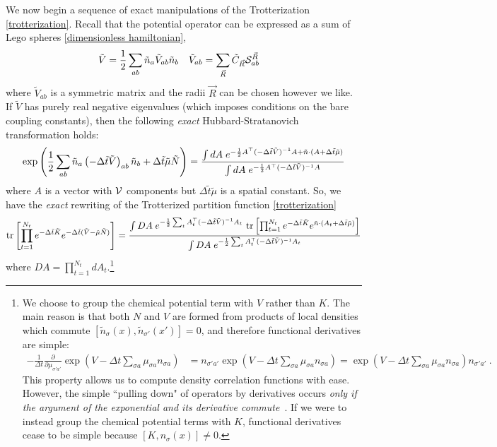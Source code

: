 We now begin a sequence of exact manipulations of the Trotterization \eqref{trotterization}.
Recall that the potential operator can be expressed as a sum of Lego spheres \eqref{dimensionless hamiltonian},
\begin{align}
	\tilde{V}
	&= \frac{1}{2} \sum_{ab} \tilde{n}_a \tilde{V}_{ab} \tilde{n}_b
	&
	\tilde{V}_{ab}
	&=
	\sum_{\vec{R}} \tilde{C}_{\vec{R}} \mathcal{S}^{\vec{R}}_{ab}
\end{align}
where $\tilde{V}_{ab}$ is a symmetric matrix and the radii $\vec{R}$ can be chosen however we like.
If $\tilde{V}$ has purely real negative eigenvalues (which imposes conditions on the bare coupling constants), then the following \emph{exact} Hubbard-Stratanovich transformation holds:
\begin{equation}
	\exp\left( \frac{1}{2} \sum_{ab}\tilde{n}_a \left(-\Delta\tilde{t} \tilde{V}\right)_{ab} \tilde{n}_b + \Delta \tilde{t} \tilde{\mu}\tilde{N}\right)
	=
	\frac{
		\int dA\; e^{-\frac{1}{2} A{}^{\top} (-\Delta\tilde{t} \tilde{V})^{-1} A + \tilde{n} \cdot (A + \Delta\tilde{t} \tilde{\mu} )}
	}{
		\int dA\; e^{-\frac{1}{2} A{}^{\top} (-\Delta\tilde{t} \tilde{V})^{-1} A}
	}
\end{equation}
where $A$ is a vector with $\mathcal{V}$ components but $\Delta\tilde{t}\tilde{\mu}$ is a spatial constant.
So, we have the \emph{exact} rewriting of the Trotterized partition function \eqref{trotterization}
\begin{equation}
	\text{tr}\left[\prod_{t=1}^{N_t} e^{-\Delta \tilde{t}\tilde{K}}  e^{-\Delta \tilde{t}(\tilde{V} - \tilde{\mu}\tilde{N})} \right]
	= 
	\frac{  
		\int DA\; e^{-\frac{1}{2} \sum_t A{}^{\top}_t (-\Delta\tilde{t} \tilde{V})^{-1} A_t}
	~	\text{tr}\left[\prod_{t=1}^{N_t} e^{-\Delta \tilde{t}\tilde{K}}  e^{ \tilde{n}\cdot (A_t + \Delta\tilde{t} \tilde{\mu})} \right] 
	}{ 
		\int DA\; e^{-\frac{1}{2} \sum_t A{}^{\top}_t (-\Delta\tilde{t} \tilde{V})^{-1} A_t}
	}
	\label{eq:trotterization bilinearized}
\end{equation}
where $DA = \prod_{t=1}^{N_t} d A_t $.\footnote{
	We choose to group the chemical potential term with $V$ rather than $K$.
	The main reason is that both $N$ and $V$ are formed from products of local densities which commute $[\tilde{n}_{\sigma}(x),\tilde{n}_{\sigma'}(x')] = 0$, and therefore functional derivatives are simple:
	\begin{align*}
		-\frac{1}{\Delta t} \frac{\partial}{\partial \mu_{\sigma 'a'}}\exp\left( V - \Delta t \sum_{\sigma a}\mu_{\sigma a} n_{\sigma a}\right) 
		&
		=  n_{\sigma' a'} \exp\left( V - \Delta t \sum_{\sigma a}\mu_{\sigma a} n_{\sigma a}\right)
		= \exp\left( V - \Delta t \sum_{\sigma a}\mu_{\sigma a} n_{\sigma a}\right) n_{\sigma' a'}~.
	\end{align*} 
	This property allows us to compute density correlation functions with ease.
	However, the simple ``pulling down" of operators by derivatives occurs \emph{only if the argument of the exponential and its derivative commute}~\cite{10.2307/4146900}.
	If we were to instead group the chemical potential terms with $K$, functional derivatives cease to be simple because $[K,n_{\sigma}(x)] \neq 0$.
}

